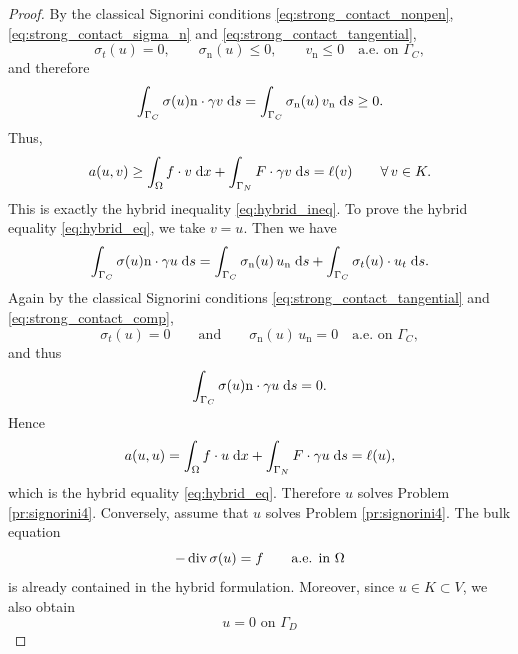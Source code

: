 \begin{proof}
	By the classical Signorini conditions \eqref{eq:strong_contact_nonpen},\eqref{eq:strong_contact_sigma_n} and \eqref{eq:strong_contact_tangential},
	\begin{equation*}
		\sigma_t(u)=0,
		\qquad
		\sigma_{\mathrm n}(u)\le 0,
		\qquad
		v_{\mathrm n}\le 0 \quad\text{a.e. on }\Gamma_C,
	\end{equation*}
	and therefore
	\begin{equation*}
		\int_{\Gamma_C} \sigma(u)\mathrm n\cdot \gamma v\;{{\mathrm{d}} s}
		=
		\int_{\Gamma_C} \sigma_{\mathrm n}(u)\,v_{\mathrm n}\;{{\mathrm{d}} s}
		\ge 0.
	\end{equation*}
	Thus,
	\begin{equation*}
		a(u,v)
		\ge
		\int_\Omega f\cdot v\;{{\mathrm{d}} x}
		+
		\int_{\Gamma_N} F\cdot \gamma v\;{{\mathrm{d}} s}
		=
		\ell(v)
		\qquad\forall\,v\in K.
	\end{equation*}
	This is exactly the hybrid inequality \eqref{eq:hybrid_ineq}. To prove the hybrid equality \eqref{eq:hybrid_eq}, we take $v=u$. Then we have
	\begin{equation*}
		\int_{\Gamma_C} \sigma(u)\mathrm n\cdot \gamma u\;{{\mathrm{d}} s}
		=
		\int_{\Gamma_C} \sigma_{\mathrm n}(u)\,u_{\mathrm n}\;{{\mathrm{d}} s}
		+
		\int_{\Gamma_C} \sigma_t(u)\cdot u_t\;{{\mathrm{d}} s}.
	\end{equation*}
	Again by the classical Signorini conditions \eqref{eq:strong_contact_tangential} and \eqref{eq:strong_contact_comp},
	\begin{equation*}
		\sigma_t(u)=0
		\qquad\text{and}\qquad
		\sigma_{\mathrm n}(u)\,u_{\mathrm n}=0
		\quad\text{a.e. on }\Gamma_C,
	\end{equation*}
	and thus
	\begin{equation*}
		\int_{\Gamma_C} \sigma(u)\mathrm n\cdot \gamma u\;{{\mathrm{d}} s}=0.
	\end{equation*}
	Hence
	\begin{equation*}
		a(u,u)
		=
		\int_\Omega f\cdot u\;{{\mathrm{d}} x}
		+
		\int_{\Gamma_N} F\cdot \gamma u\;{{\mathrm{d}} s}
		=
		\ell(u),
	\end{equation*}
	which is the hybrid equality \eqref{eq:hybrid_eq}. Therefore $u$ solves Problem \ref{pr:signorini4}. Conversely, assume that $u$ solves Problem \ref{pr:signorini4}. The bulk equation
	\begin{equation*}
		-\diver\sigma(u)=f
		\qquad\text{a.e. in }\Omega
	\end{equation*}
	is already contained in the hybrid formulation. Moreover, since $u\in K\subset V$, we also obtain
	\begin{equation*}
		u=0 \text{ on }\Gamma_D

\end{equation*}
\end{proof}
